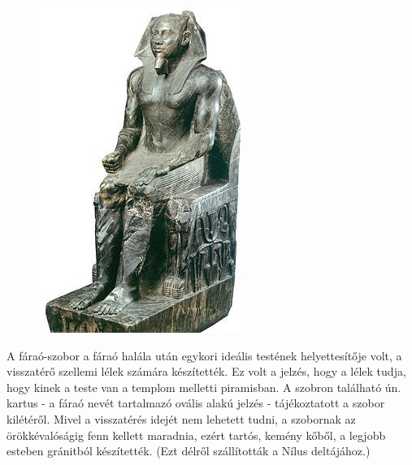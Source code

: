 \begin{figure}
	\begin{tcolorbox}[enhanced,colframe=gray!50!white,
		colbacktitle=gray!15!white,
		coltitle=gray!50!black,
		borderline={0.5mm}{0mm}{gray!15!white},
		borderline={0.5mm}{0mm}{gray!50!white,dashed},
		attach boxed title to top center={yshift=-2mm},
		boxed title style={boxrule=0.4pt},
		title=Kefrén fáraó szobra]{
			\includegraphics[width=1.0\linewidth]{images/01/kefren_szobra}}
	\end{tcolorbox}
\end{figure} 

A fáraó-szobor a fáraó halála után egykori ideális testének helyettesítője volt, a visszatérő szellemi lélek számára készítették. Ez volt a jelzés, hogy a lélek tudja, hogy kinek a teste van a templom melletti piramisban. A szobron található ún. kartus - a fáraó nevét tartalmazó ovális alakú jelzés - tájékoztatott a szobor kilétéről. Mivel a visszatérés idejét nem lehetett tudni, a szobornak az örökkévalóságig fenn kellett maradnia, ezért tartós, kemény kőből, a legjobb esteben gránitból készítették. (Ezt délről szállították a Nílus deltájához.)

